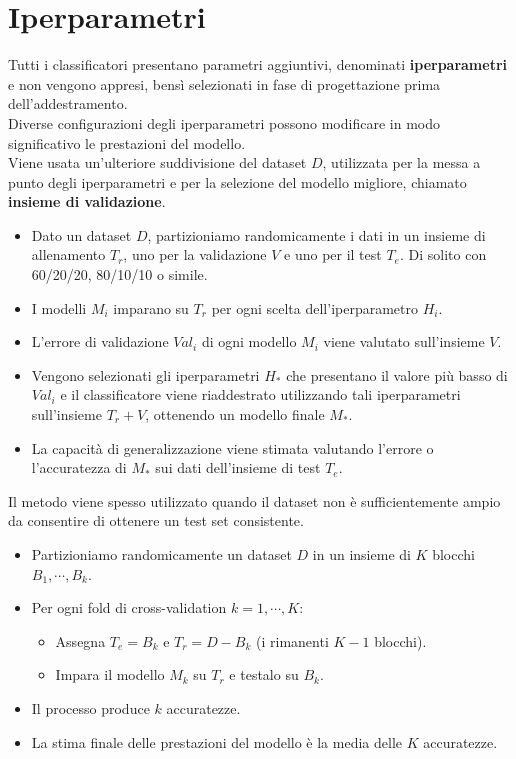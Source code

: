 \section{Iperparametri}
Tutti i classificatori presentano parametri aggiuntivi, denominati \textbf{iperparametri} e non vengono appresi, bensì selezionati in fase di progettazione prima dell'addestramento. \\
Diverse configurazioni degli iperparametri possono modificare in modo significativo le prestazioni del modello. \\
Viene usata un'ulteriore suddivisione del dataset $D$, utilizzata per la messa a punto degli iperparametri e per la selezione del modello migliore, chiamato \textbf{insieme di validazione}.

\newpage
\begin{ex}
  \begin{itemize}
    \item Dato un dataset $D$, partizioniamo randomicamente i dati in un insieme di allenamento $T_r$, uno per la validazione $V$ e uno per il test $T_e$. Di solito con  60/20/20, 80/10/10 o simile.
    \item I modelli $M_i$ imparano su $T_r$ per ogni scelta dell'iperparametro $H_i$.
    \item L'errore di validazione $Val_i$ di ogni modello $M_i$ viene valutato sull'insieme $V$.
    \item Vengono selezionati gli iperparametri $H_*$ che presentano il valore più basso di $Val_i$ e il classificatore viene riaddestrato utilizzando tali iperparametri sull'insieme $T_r + V$, ottenendo un modello finale $M_*$.
    \item La capacità di generalizzazione viene stimata valutando l'errore o l'accuratezza di $M_*$ sui dati dell'insieme di test $T_e$.
  \end{itemize}
\end{ex}

\begin{ex}
  Il metodo viene spesso utilizzato quando il dataset non è sufficientemente ampio da consentire di ottenere un test set consistente.
  \begin{itemize}
    \item Partizioniamo randomicamente un dataset $D$ in un insieme di $K$ blocchi $B_1, \cdots, B_k$.
    \item Per ogni fold di cross-validation $k = 1, \cdots, K$:
    \begin{itemize}
      \item Assegna $T_e = B_k$ e $T_r = D - {B_k}$ (i rimanenti $K-1$ blocchi).
      \item Impara il modello $M_k$ su $T_r$ e testalo su $B_k$.
    \end{itemize}
    \item Il processo produce $k$ accuratezze.
    \item La stima finale delle prestazioni del modello è la media delle $K$ accuratezze.
  \end{itemize}
\end{ex}

